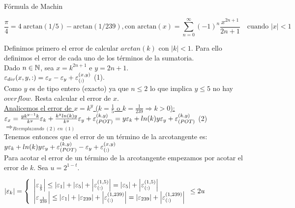 \begin{subsection}{Fórmula de Machin}

	\begin{equation*}
		\frac{\pi}{4} = 4 \; \mathrm{arctan}(1/5) - \mathrm{arctan}(1/239), \text{con } \mathrm{arctan}(x) = \sum_{n=0}^{\infty} \left(-1\right)^n \frac{x^{2n+1}}{2n+1} \quad \text{cuando } \left|x\right|<1
    \end{equation*}
	
	Definimos primero el error de calcular $arctan(k)$ con $|k|<1$. Para ello definimos el error de cada uno de los términos de la sumatoria.\\
	
	Dado $n \in \mathbb{N}$, sea $x=k^{2n+1}$ e $y=2n+1$.\\
	
	$\varepsilon _{div}({x,y,:}) = \varepsilon _{x} - \varepsilon _{y} + \varepsilon _{({:})}^{({x,y})}$ (1).\\
	
	Como $y$ es de tipo entero (exacto) ya que $n \leq 2$ lo que implica $y \leq 5$ no hay $overflow$. Resta calcular el error de $x$.\\
	
	\underline{Analicemos el error de $x=k^y$ ($k=\frac{1}{5}$ o $k=\frac{1}{239} \Rightarrow k>0$):}\\
	
	$\texttt{$\varepsilon _{x}$}=\frac{yk^{y-1}k}{k^y}\varepsilon _{k}+\frac{k^y ln(k) y}{k^y}\varepsilon _{y} + \varepsilon _{({POT})}^{({k,y})} = y\varepsilon _{k} + ln(k) y\varepsilon _{y} + \varepsilon _{({POT})}^{({k,y})}$ (2)\\ 
	
	$\Rightarrow_{Reemplazando \; (2) \; en \; (1)}$\\
	
	Tenemos entonces que el error de un término de la arcotangente es:\\
	
	$y\varepsilon _{k} + ln(k) y\varepsilon _{y} + \varepsilon _{({POT})}^{({k,y})} - \varepsilon _{y} + \varepsilon _{({:})}^{({x,y})}$\\
	
	Para acotar el error de un término de la arcotangente empezamos por acotar el error de $k$.
	Sea $u=2^{1-t}$.\\
	
	\pa
	
	$\left|\varepsilon _{k}\right| = \left\{ 
	\begin{array}{l}
	\left|\varepsilon _{\frac{1}{5}}\right| \leq \left|\varepsilon _{1}\right| + \left|\varepsilon _{5}\right| + \left|\varepsilon _{({:})}^{({1,5})}\right| = \left|\varepsilon _{5}\right| + \left|\varepsilon _{({:})}^{({1,5})}\right|\\
	\left|\varepsilon _{\frac{1}{239}}\right| \leq \left|\varepsilon _{1}\right| + \left|\varepsilon _{239}\right| + \left|\varepsilon _{({:})}^{({1,239})}\right| = \left|\varepsilon _{239}\right| + \left|\varepsilon _{({:})}^{({1,239})}\right|\\
	\end{array}
	\leq 2u\\
	\right.$\\
	

\end{subsection}
